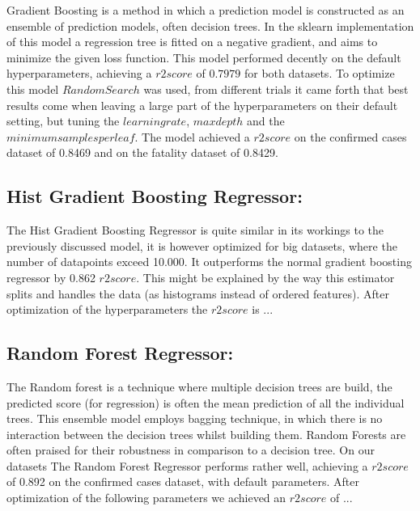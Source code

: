 \documentclass{article}
\begin{document}
Gradient Boosting is a method in which a prediction model is constructed as an ensemble of prediction models, often decision trees. In the sklearn implementation of this model a regression tree is fitted on a negative gradient, and aims to minimize the given loss function. 
This model performed decently on the default hyperparameters, achieving a $r2 score$ of $0.7979$ for both datasets. To optimize this model $Random Search$ was used, from different trials it came forth that best results come when leaving a large part of the hyperparameters on their default setting, but tuning the $learning rate$, $max depth$ and the $minimum samples per leaf$. The model achieved a $r2 score$ on the confirmed cases dataset of 0.8469 and on the fatality dataset of 0.8429. 

\subsection{Hist Gradient Boosting Regressor:}
The Hist Gradient Boosting Regressor is quite similar in its workings to the previously discussed model, it is however optimized for big datasets, where the number of datapoints exceed 10.000. 
It outperforms the normal gradient boosting regressor by 0.862 $r2 score$. This might be explained by the way this estimator splits and handles the data (as histograms instead of ordered features). 
After optimization of the hyperparameters the $r2 score$ is ...

\subsection{Random Forest Regressor:}
The Random forest is a technique where multiple decision trees are build, the predicted score (for regression) is often the mean prediction of all the individual trees. This ensemble model employs bagging technique, in which there is no interaction between the decision trees whilst building them. 
Random Forests are often praised for their robustness in comparison to a decision tree. 
On our datasets The Random Forest Regressor performs rather well, achieving a $r2 score$ of 0.892 on the confirmed cases dataset, with default parameters. After optimization of the following parameters we achieved an $r2 score$ of ...
\end{document}
